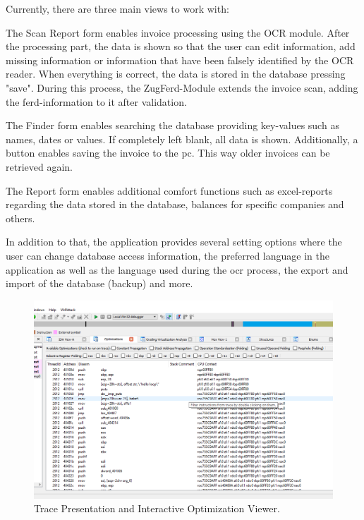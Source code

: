 \documentclass[10pt,twoside,a4paper,bibliography=totoc]{scrbook}
\begin{document}
Currently, there are three main views to work with:

The Scan Report form enables invoice processing using the OCR module. After the processing part, the data is shown so that the user can edit information, add missing information or information that have been falsely identified by the OCR reader.
When everything is correct, the data is stored in the database pressing "save". During this process, the ZugFerd-Module extends the invoice scan, adding the ferd-information to it after validation.

The Finder form enables searching the database providing key-values such as names, dates or values. If completely left blank, all data is shown.
Additionally, a button enables saving the invoice to the pc. This way older invoices can be retrieved again.

The Report form enables additional comfort functions such as excel-reports regarding the data stored in the database, balances for specific companies and others.

In addition to that, the application provides several setting options where the user can change database access information, the preferred language in the application as well as the language used during the ocr process, the export and import of the database (backup) and more.

\begin{figure}[htp]
\centering
\includegraphics[scale=0.40]{images/ch3/optimizations1.png}
\caption{Trace Presentation and Interactive Optimization Viewer.}
\label{opti1}
\end{figure}
\end{document}
